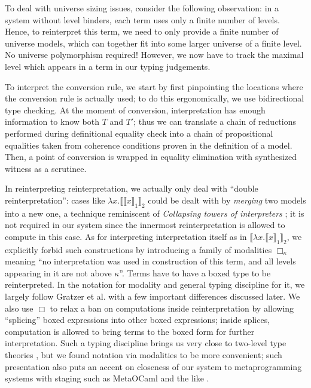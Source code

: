 To deal with universe sizing issues, consider the
following observation: in a system without level
binders, each term uses only a finite number of levels.
Hence, to reinterpret this term, we need to only provide
a finite number of universe models, which can together
fit into some larger universe of a finite level. No
universe polymorphism required! However, we now have to
track the maximal level which appears in a term in our
typing judgements.

To interpret the conversion rule, we start by first
pinpointing the locations where the conversion rule is
actually used; to do this ergonomically, we
use bidirectional type checking. At the moment of
conversion, interpretation has enough information to
know both $T$ and $T'$; thus we can translate a chain
of reductions performed during definitional equality
check into a chain of propositional equalities taken
from coherence conditions proven in the definition of a
model. Then, a point of conversion is wrapped in
equality elimination with synthesized witness as a
scrutinee.

In reinterpreting reinterpretation, we actually only
deal with ``double reinterpretation'': cases like
$\lambda x.\llbracket\llbracket x\rrbracket_1
\rrbracket_2$ could be dealt with by \textit{merging}
two models into a new one, a technique reminiscent of
\textit{Collapsing towers of interpreters}
\cite{Amin2017}; it is not required in our system since
the innermost reinterpretation is allowed to compute in
this case. As for interpreting interpretation itself as
in $\llbracket\lambda x.\llbracket x \rrbracket_1
\rrbracket_2$, we explicitly forbid such constructions
by introducing a family of modalities $\Box_\kappa$
meaning ``no interpretation was used in construction of
this term, and all levels appearing in it are not above
$\kappa$''. Terms have to have a boxed type to be
reinterpreted. In the notation for modality and general
typing discipline for it, we largely follow Gratzer et
al. \cite{Gratzer2019} with a few important differences
discussed later. We also use $\Box$ to relax a ban on
computations inside reinterpretation by allowing
``splicing'' boxed expressions into other boxed
expressions; inside splices, computation is allowed to
bring terms to the boxed form for further
interpretation. Such a typing discipline brings us very
close to two-level type theories
\cite{annenkov2023twolevel,kovacs2022staged}, but we
found notation via modalities to be more convenient;
such presentation also puts an accent on closeness of
our system to metaprogramming systems with staging such
as MetaOCaml and the like
\cite{kiselyov2014metaocaml,
kawata2021dependentlytypedmultistagecalculus,
taha2000metaml}.

